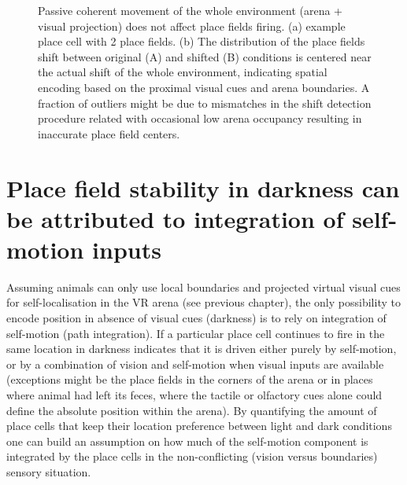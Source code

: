 \begin{figure}
\captionsetup{format=plain}
\caption[Spatial orientation relative to proximal cues]{
Passive coherent movement of the whole environment (arena + visual projection) does not affect place fields firing. (a) example place cell with 2 place fields. (b) The distribution of the place fields shift between original (A) and shifted (B) conditions is centered near the actual shift of the whole environment, indicating spatial encoding based on the proximal visual cues and arena boundaries. A fraction of outliers might be due to mismatches in the shift detection procedure related with occasional low arena occupancy resulting in inaccurate place field centers.
}
\label{fig:F16_proximal_cues_geometry}
\end{figure}


\section[Integration of self-motion inputs in darkness]{Place field stability in darkness can be attributed to integration of self-motion inputs%
              }
\label{sec:integration_of_sm_imputs}

Assuming animals can only use local boundaries and projected virtual visual cues for self-localisation in the VR arena (see previous chapter), the only possibility to encode position in absence of visual cues (darkness) is to rely on integration of self-motion (path integration). If a particular place cell continues to fire in the same location in darkness indicates that it is driven either purely by self-motion, or by a combination of vision and self-motion when visual inputs are available (exceptions might be the place fields in the corners of the arena or in places where animal had left its feces, where the tactile or olfactory cues alone could define the absolute position within the arena). By quantifying the amount of place cells that keep their location preference between light and dark conditions one can build an assumption on how much of the self-motion component is integrated by the place cells in the non-conflicting (vision versus boundaries) sensory situation.

